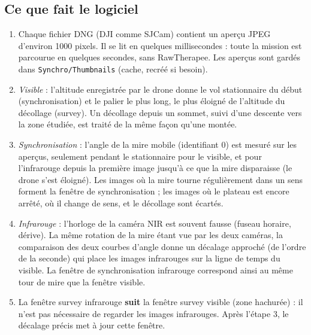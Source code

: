 \documentclass[a4paper,11pt]{report}
\begin{document}
\subsection*{Ce que fait le logiciel}
\begin{enumerate}
	\item Chaque fichier DNG (DJI comme SJCam) contient un aperçu JPEG d'environ 1000 pixels. Il se lit en quelques millisecondes : toute la mission est parcourue en quelques secondes, sans RawTherapee. Les aperçus sont gardés dans \texttt{Synchro/Thumbnails} (cache, recréé si besoin).
	\item \emph{Visible} : l'altitude enregistrée par le drone donne le vol stationnaire du début (synchronisation) et le palier le plus long, le plus éloigné de l'altitude du décollage (survey). Un décollage depuis un sommet, suivi d'une descente vers la zone étudiée, est traité de la même façon qu'une montée.
	\item \emph{Synchronisation} : l'angle de la mire mobile (identifiant 0) est mesuré sur les aperçus, seulement pendant le stationnaire pour le visible, et pour l'infrarouge depuis la première image jusqu'à ce que la mire disparaisse (le drone s'est éloigné). Les images où la mire tourne régulièrement dans un sens forment la fenêtre de synchronisation ; les images où le plateau est encore arrêté, où il change de sens, et le décollage sont écartés.
	\item \emph{Infrarouge} : l'horloge de la caméra NIR est souvent fausse (fuseau horaire, dérive). La même rotation de la mire étant vue par les deux caméras, la comparaison des deux courbes d'angle donne un décalage approché (de l'ordre de la seconde) qui place les images infrarouges sur la ligne de temps du visible. La fenêtre de synchronisation infrarouge correspond ainsi au même tour de mire que la fenêtre visible.
	\item La fenêtre survey infrarouge \textbf{suit} la fenêtre survey visible (zone hachurée) : il n'est pas nécessaire de regarder les images infrarouges. Après l'étape 3, le décalage précis met à jour cette fenêtre.
\end{enumerate}
\end{document}

